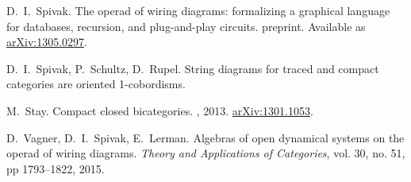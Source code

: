 \begin{thebibliography}{RSW00}



    D.\ I.\  Spivak.
    \newblock The operad of wiring diagrams:
    formalizing a graphical language for databases, recursion, and plug-and-play
    circuits.
    \newblock preprint.
    \newblock Available as
    \href{http://arxiv.org/abs/1305.0297}{arXiv:1305.0297}.

    D.\ I.\ Spivak, P.\ Schultz, D.\ Rupel.
    \newblock String diagrams for traced and compact categories are oriented 1-cobordisms.

    M.\ Stay.
    \newblock Compact closed bicategories.
    , 2013. 
    \newblock \href{http://arxiv.org/abs/1301.1053}{arXiv:1301.1053}.


    D.\ Vagner, D.\ I.\ Spivak, E.\ Lerman.
    \newblock Algebras of open
    dynamical systems on the operad of wiring diagrams.
    \newblock \emph{Theory and
    Applications of Categories}, vol. 30, no. 51, pp 1793--1822, 2015. 





\end{thebibliography}
